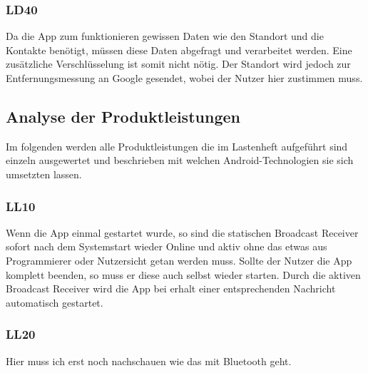 \subsubsection{LD40}
Da die App zum funktionieren gewissen Daten wie den Standort und die Kontakte ben\"otigt, m\"ussen diese Daten abgefragt und verarbeitet werden. Eine zus\"atzliche Verschl\"usselung ist somit nicht n\"otig. Der Standort wird jedoch zur Entfernungsmessung an Google gesendet, wobei der Nutzer hier zustimmen muss.


\subsection{Analyse der Produktleistungen}
Im folgenden werden alle Produktleistungen die im Lastenheft aufgef\"uhrt sind einzeln ausgewertet und beschrieben mit welchen Android-Technologien sie sich umsetzten lassen.

\subsubsection{LL10}
Wenn die App einmal gestartet wurde, so sind die statischen Broadcast Receiver sofort nach dem Systemstart wieder Online und aktiv ohne das etwas aus Programmierer oder Nutzersicht getan werden muss. Sollte der Nutzer die App komplett beenden, so muss er diese auch selbst wieder starten.
Durch die aktiven Broadcast Receiver wird die App bei erhalt einer entsprechenden Nachricht automatisch gestartet.

\subsubsection{LL20}
{\color{red}Hier muss ich erst noch nachschauen wie das mit Bluetooth geht.}